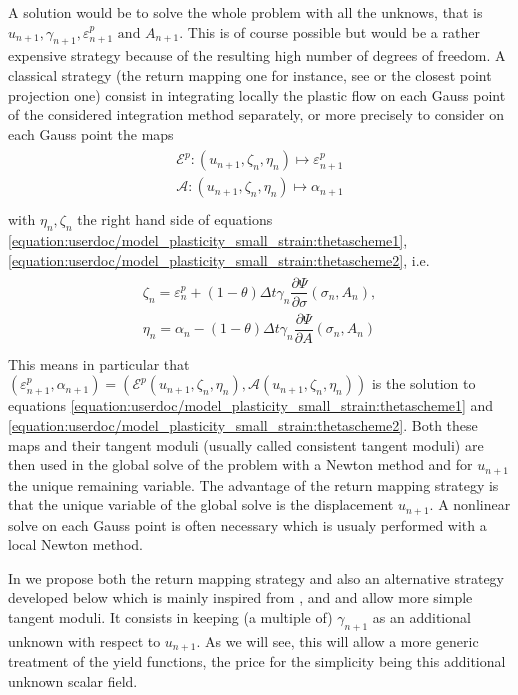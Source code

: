 \documentclass[a4paper,11pt,english]{sphinxmanual}
\begin{document}
A solution would be to solve the whole problem with all the unknows, that is \(u_{n+1},  \gamma_{n+1}, \varepsilon^p_{n+1} \mbox{ and } A_{n+1}\). This is of course possible but would be a rather expensive strategy because of the resulting high number of degrees of freedom. A classical strategy (the return mapping one for instance, see  or the closest point projection one) consist in integrating locally the plastic flow on each Gauss point of the considered integration method separately, or more precisely to consider on each Gauss point the maps
\begin{align*}\!\begin{aligned}
{\mathscr E}^p : (u_{n+1}, \zeta_n, \eta_n) \mapsto \varepsilon^p_{n+1}\\
{\mathscr A} : (u_{n+1}, \zeta_{n}, \eta_n) \mapsto \alpha_{n+1}\\
\end{aligned}\end{align*}
with \(\eta_n, \zeta_{n}\) the right hand side of equations \eqref{equation:userdoc/model_plasticity_small_strain:thetascheme1}, \eqref{equation:userdoc/model_plasticity_small_strain:thetascheme2}, i.e.
\begin{align*}\!\begin{aligned}
\zeta_n = \varepsilon^p_{n} + (1-\theta)\Delta t \gamma_n \dfrac{\partial \Psi}{\partial \sigma}(\sigma_{n}, A_{n}) ,\\
\eta_n = \alpha_n - (1-\theta)\Delta t \gamma_n \dfrac{\partial \Psi}{\partial A}(\sigma_{n}, A_{n})\\
\end{aligned}\end{align*}
This means in particular that \((\varepsilon^p_{n+1}, \alpha_{n+1}) = ({\mathscr E}^p(u_{n+1},  \zeta_n, \eta_n), {\mathscr A}(u_{n+1}, \zeta_{n}, \eta_n))\) is the solution to equations \eqref{equation:userdoc/model_plasticity_small_strain:thetascheme1} and \eqref{equation:userdoc/model_plasticity_small_strain:thetascheme2}. Both these maps and their tangent moduli (usually called consistent tangent moduli) are then used in the global solve of the problem with a Newton method and for \(u_{n+1}\) the unique remaining variable. The advantage of the return mapping strategy is that the unique variable of the global solve is the displacement \(u_{n+1}\). A nonlinear solve on each Gauss point is often necessary which is usualy performed with a local Newton method.

In  we propose both the return mapping strategy and also an alternative strategy developed below which is mainly inspired from  ,   and  and allow more simple tangent moduli. It consists in keeping (a multiple of) \(\gamma_{n+1}\) as an additional unknown with respect to \(u_{n+1}\). As we will see, this will allow a more generic treatment of the yield functions, the price for the simplicity being this additional unknown scalar field.
\end{document}
